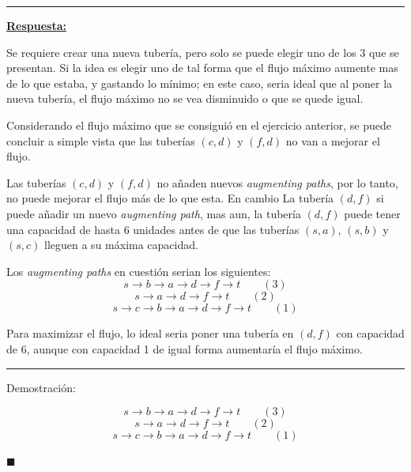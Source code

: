 \documentclass[10pt]{article}
\begin{document}
\begin{enumerate}[1)]
\rule{5cm}{0.4pt}

\underline{\textbf{Respuesta:}}

Se requiere crear una nueva tubería, pero solo se puede elegir uno de los 3 que se presentan. Si la idea es elegir uno de tal forma que el flujo máximo aumente mas de lo que estaba, y gastando lo mínimo; en este caso, seria ideal que al poner la nueva tubería, el flujo máximo no se vea disminuido o que se quede igual.

Considerando el flujo máximo que se consiguió en el ejercicio anterior, se puede concluir a simple vista que las tuberías $(c,d)$ y $(f,d)$ no van a mejorar el flujo.

\newpage

Las tuberías $(c,d)$ y $(f,d)$ no añaden nuevos \textit{augmenting paths}, por lo tanto, no puede mejorar el flujo más de lo que esta. En cambio La tubería $(d,f)$ si puede añadir un nuevo \textit{augmenting path}, mas aun, la tubería $(d,f)$ puede tener una capacidad de hasta 6 unidades antes de que las tuberías $(s,a)$, $(s,b)$ y $(s,c)$ lleguen a su máxima capacidad.

Los \textit{augmenting paths} en cuestión serian los siguientes:
\[s \rightarrow b \rightarrow a \rightarrow d \rightarrow f \rightarrow t \qquad (3)\]
\[s \rightarrow a \rightarrow d \rightarrow f \rightarrow t \qquad (2)\]
\[s \rightarrow c \rightarrow b \rightarrow a \rightarrow d \rightarrow f \rightarrow t \qquad (1)\]


Para maximizar el flujo, lo ideal seria poner una tubería en $(d,f)$ con capacidad de 6, aunque con capacidad 1 de igual forma aumentaría el flujo máximo.

\rule{5cm}{0.4pt}

Demostración:

\[s \rightarrow b \rightarrow a \rightarrow d \rightarrow f \rightarrow t \qquad (3)\]
\[s \rightarrow a \rightarrow d \rightarrow f \rightarrow t \qquad (2)\]
\[s \rightarrow c \rightarrow b \rightarrow a \rightarrow d \rightarrow f \rightarrow t \qquad (1)\]

\hfill \(\blacksquare\)



\end{enumerate}

\end{document}

